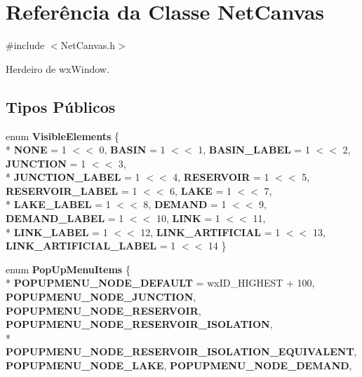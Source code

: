 \section{Referência da Classe Net\+Canvas}
\label{class_net_canvas}


{\ttfamily \#include $<$Net\+Canvas.\+h$>$}



Herdeiro de wx\+Window.

\subsection*{Tipos Públicos}
\begin{DoxyCompactItemize}
\item 
enum {\bf Visible\+Elements} \{ \\*
{\bf N\+O\+NE} = 1 $<$$<$ 0, 
{\bf B\+A\+S\+IN} = 1 $<$$<$ 1, 
{\bf B\+A\+S\+I\+N\+\_\+\+L\+A\+B\+EL} = 1 $<$$<$ 2, 
{\bf J\+U\+N\+C\+T\+I\+ON} = 1 $<$$<$ 3, 
\\*
{\bf J\+U\+N\+C\+T\+I\+O\+N\+\_\+\+L\+A\+B\+EL} = 1 $<$$<$ 4, 
{\bf R\+E\+S\+E\+R\+V\+O\+IR} = 1 $<$$<$ 5, 
{\bf R\+E\+S\+E\+R\+V\+O\+I\+R\+\_\+\+L\+A\+B\+EL} = 1 $<$$<$ 6, 
{\bf L\+A\+KE} = 1 $<$$<$ 7, 
\\*
{\bf L\+A\+K\+E\+\_\+\+L\+A\+B\+EL} = 1 $<$$<$ 8, 
{\bf D\+E\+M\+A\+ND} = 1 $<$$<$ 9, 
{\bf D\+E\+M\+A\+N\+D\+\_\+\+L\+A\+B\+EL} = 1 $<$$<$ 10, 
{\bf L\+I\+NK} = 1 $<$$<$ 11, 
\\*
{\bf L\+I\+N\+K\+\_\+\+L\+A\+B\+EL} = 1 $<$$<$ 12, 
{\bf L\+I\+N\+K\+\_\+\+A\+R\+T\+I\+F\+I\+C\+I\+AL} = 1 $<$$<$ 13, 
{\bf L\+I\+N\+K\+\_\+\+A\+R\+T\+I\+F\+I\+C\+I\+A\+L\+\_\+\+L\+A\+B\+EL} = 1 $<$$<$ 14
 \}
\item 
enum {\bf Pop\+Up\+Menu\+Items} \{ \\*
{\bf P\+O\+P\+U\+P\+M\+E\+N\+U\+\_\+\+N\+O\+D\+E\+\_\+\+D\+E\+F\+A\+U\+LT} = wx\+I\+D\+\_\+\+H\+I\+G\+H\+E\+ST + 100, 
{\bf P\+O\+P\+U\+P\+M\+E\+N\+U\+\_\+\+N\+O\+D\+E\+\_\+\+J\+U\+N\+C\+T\+I\+ON}, 
{\bf P\+O\+P\+U\+P\+M\+E\+N\+U\+\_\+\+N\+O\+D\+E\+\_\+\+R\+E\+S\+E\+R\+V\+O\+IR}, 
{\bf P\+O\+P\+U\+P\+M\+E\+N\+U\+\_\+\+N\+O\+D\+E\+\_\+\+R\+E\+S\+E\+R\+V\+O\+I\+R\+\_\+\+I\+S\+O\+L\+A\+T\+I\+ON}, 
\\*
{\bf P\+O\+P\+U\+P\+M\+E\+N\+U\+\_\+\+N\+O\+D\+E\+\_\+\+R\+E\+S\+E\+R\+V\+O\+I\+R\+\_\+\+I\+S\+O\+L\+A\+T\+I\+O\+N\+\_\+\+E\+Q\+U\+I\+V\+A\+L\+E\+NT}, 
{\bf P\+O\+P\+U\+P\+M\+E\+N\+U\+\_\+\+N\+O\+D\+E\+\_\+\+L\+A\+KE}, 
{\bf P\+O\+P\+U\+P\+M\+E\+N\+U\+\_\+\+N\+O\+D\+E\+\_\+\+D\+E\+M\+A\+ND}, 
$$
\end{DoxyCompactItemize}
